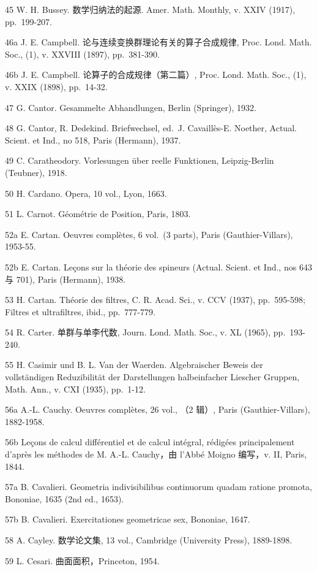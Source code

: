 45 W. H. Bussey. 数学归纳法的起源. Amer. Math. Monthly, v. XXIV (1917), pp.~199-207.

46a J. E. Campbell. 论与连续变换群理论有关的算子合成规律, Proc. Lond. Math. Soc., (1), v. XXVIII (1897), pp.~381-390.

46b J. E. Campbell. 论算子的合成规律（第二篇）, Proc. Lond. Math. Soc., (1), v. XXIX (1898), pp.~14-32.

47 G. Cantor. Gesammelte Abhandlungen, Berlin (Springer), 1932.

48 G. Cantor, R. Dedekind. Briefwechsel, ed.~J. Cavaillès-E. Noether, Actual. Scient. et Ind., no 518, Paris (Hermann), 1937.

49 C. Caratheodory. Vorlesungen über reelle Funktionen, Leipzig-Berlin (Teubner), 1918.

50 H. Cardano. Opera, 10 vol., Lyon, 1663.

51 L. Carnot. Géométrie de Position, Paris, 1803.

52a E. Cartan. Oeuvres complètes, 6 vol.~(3 parts), Paris (Gauthier-Villars), 1953-55.

52b E. Cartan. Leçons sur la théorie des spineurs (Actual. Scient. et Ind., nos 643 与 701), Paris (Hermann), 1938.

53 H. Cartan. Théorie des filtres, C. R. Acad. Sci., v. CCV (1937), pp.~595-598; Filtres et ultrafiltres, ibid., pp.~777-779.

54 R. Carter. 单群与单李代数, Journ. Lond. Math. Soc., v. XL (1965), pp.~193-240.

55 H. Casimir und B. L. Van der Waerden. Algebraischer Beweis der vollständigen Reduzibilität der Darstellungen halbeinfacher Liescher Gruppen, Math. Ann., v. CXI (1935), pp.~1-12.

56a A.-L. Cauchy. Oeuvres complètes, 26 vol., （2 辑）, Paris (Gauthier-Villars), 1882-1958.

56b Leçons de calcul différentiel et de calcul intégral, rédigées principalement d'après les méthodes de M. A.-L. Cauchy，由 l'Abbé Moigno 编写，v. II, Paris, 1844.

57a B. Cavalieri. Geometria indivisibilibus continuorum quadam ratione promota, Bononiae, 1635 (2nd ed., 1653).

57b B. Cavalieri. Exercitationes geometricae sex, Bononiae, 1647.

58 A. Cayley. 数学论文集, 13 vol., Cambridge (University Press), 1889-1898.

59 L. Cesari. 曲面面积，Princeton, 1954.


